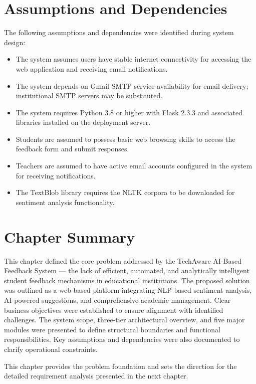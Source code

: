 
\section{Assumptions and Dependencies}

The following assumptions and dependencies were identified during system design:

\begin{itemize}
    \item The system assumes users have stable internet connectivity for accessing the web application and receiving email notifications.
    \item The system depends on Gmail SMTP service availability for email delivery; institutional SMTP servers may be substituted.
    \item The system requires Python 3.8 or higher with Flask 2.3.3 and associated libraries installed on the deployment server.
    \item Students are assumed to possess basic web browsing skills to access the feedback form and submit responses.
    \item Teachers are assumed to have active email accounts configured in the system for receiving notifications.
    \item The TextBlob library requires the NLTK corpora to be downloaded for sentiment analysis functionality.
\end{itemize}

\section{Chapter Summary}

This chapter defined the core problem addressed by the TechAware AI-Based Feedback System — the lack of efficient, automated, and analytically intelligent student feedback mechanisms in educational institutions. The proposed solution was outlined as a web-based platform integrating NLP-based sentiment analysis, AI-powered suggestions, and comprehensive academic management. Clear business objectives were established to ensure alignment with identified challenges. The system scope, three-tier architectural overview, and five major modules were presented to define structural boundaries and functional responsibilities. Key assumptions and dependencies were also documented to clarify operational constraints.

This chapter provides the problem foundation and sets the direction for the detailed requirement analysis presented in the next chapter.
